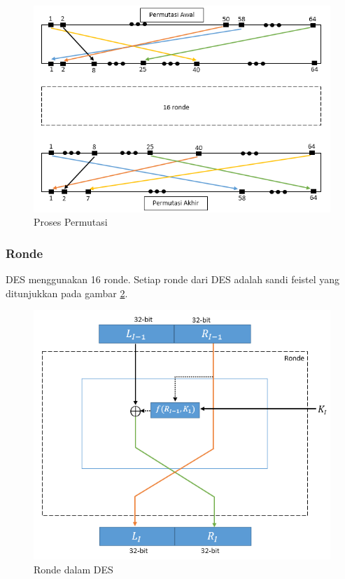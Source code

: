 \begin{figure}[H]
\includegraphics[scale=0.6]{Gambar/proses_permutasi}
\centering
\caption{Proses Permutasi}\label{fig:prosespermutasi}
\end{figure}

\subsubsection{Ronde}
DES menggunakan 16 ronde. Setiap ronde dari DES adalah sandi feistel yang ditunjukkan pada gambar \ref{fig:rondedes}.

\begin{figure}[H]
\includegraphics[scale=0.6]{Gambar/round}
\centering
\caption{Ronde dalam DES}\label{fig:rondedes}
\end{figure}

